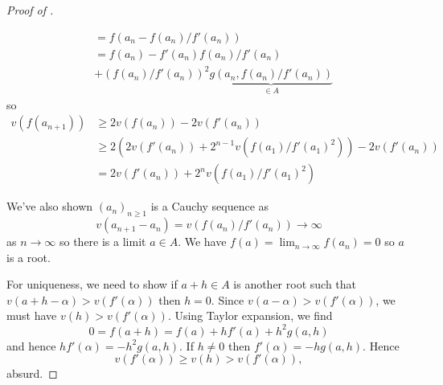 \documentclass[a4paper]{article}
\begin{document}
\begin{proof}[Proof of ]
\begin{enumerate}
\begin{align*}
      &= f(a_n - f(a_n)/f'(a_n)) \\
      &= f(a_n) - f'(a_n)f(a_n)/ f'(a_n) \\
      &+ (f(a_n)/f'(a_n))^2 \underbrace{g(a_n, f(a_n)/f'(a_n))}_{\in A}
    \end{align*}
    so
    \begin{align*}
      v(f(a_{n + 1}))
      &\geq 2v(f(a_n)) - 2v(f'(a_n)) \\
      &\geq 2(2v(f'(a_n)) + 2^{n - 1} v(f(a_1)/f'(a_1)^2)) - 2v(f'(a_n)) \\
      &= 2v(f'(a_n)) + 2^n v(f(a_1)/f'(a_1)^2)
    \end{align*}
  \end{enumerate}
  We've also shown \((a_n)_{n \geq 1}\) is a Cauchy sequence as
  \[
    v(a_{n + 1} - a_n) = v(f(a_n)/f'(a_n)) \to \infty
  \]
  as \(n \to \infty\) so there is a limit \(a \in A\). We have \(f(a) = \lim_{n \to \infty} f(a_n) = 0\) so \(a\) is a root.

  For uniqueness, we need to show if \(a + h \in A\) is another root such that \(v(a + h - \alpha) > v(f'(\alpha))\) then \(h = 0\). Since \(v(a - \alpha) > v(f'(\alpha))\), we must have \(v(h) > v(f'(\alpha))\). Using Taylor expansion, we find
  \[
    0 = f(a + h) = f(a) + hf'(a) + h^2 g(a, h)
  \]
  and hence \(hf'(\alpha) = -h^2 g(a, h)\). If \(h \neq 0\) then \(f'(\alpha) = -h g(a, h)\). Hence
  \[
    v(f'(\alpha)) \geq v(h) > v(f'(\alpha)),
  \]
  absurd.
\end{proof}
\end{document}

